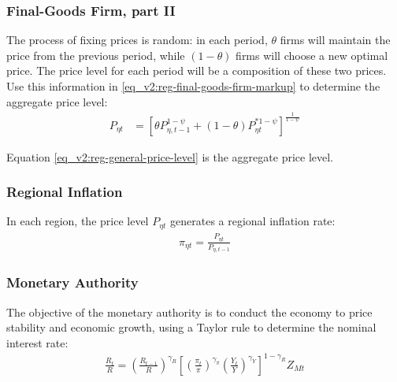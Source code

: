 \documentclass[../thesis.tex]{subfiles}
\begin{document}

\subsubsection*{Final-Goods Firm, part II}

The process of fixing prices is random: in each period, $\theta$ firms will maintain the price from the previous period, while $(1-\theta)$ firms will choose a new optimal price. The price level for each period will be a composition of these two prices. Use this information in \ref{eq_v2:reg-final-goods-firm-markup} to determine the aggregate price level:
\begin{align}
	P_{\eta t} & = \left[ \theta P_{\eta, t-1}^{1-\psi} + (1-\theta) P_{\eta t}^{\ast 1-\psi} \right]^\frac{1}{1-\psi} \label{eq_v2:reg-general-price-level}
\end{align}

Equation \ref{eq_v2:reg-general-price-level} is the aggregate price level.


\subsubsection*{Regional Inflation}

In each region, the price level $P_{\eta t}$ generates a regional inflation rate:
\begin{align}
	\pi_{\eta t} = \frac{P_{\eta t}}{P_{\eta, t-1}} \label{eq_v2:reg-regional-inflation}
\end{align}


\subsubsection{Monetary Authority}

The objective of the monetary authority is to conduct the economy to price stability and economic growth, using a Taylor rule \cite{taylor_discretion_1993} to determine the nominal interest rate:
\begin{align}
	\label{eq_v2:reg-monetary-policy}
	\frac{R_{t}}{R} =
	\left( \frac{R_{t-1}}{R} \right)^{\gamma_{R}}  \left[
	\left( \frac{\pi_t}{\pi} \right)^{\gamma_{\pi}}
	\left( \frac{Y_{t}}{Y} \right)^{\gamma_{Y}} \right]^{1-\gamma_{R}} Z_{Mt}
\end{align}
\end{document}

